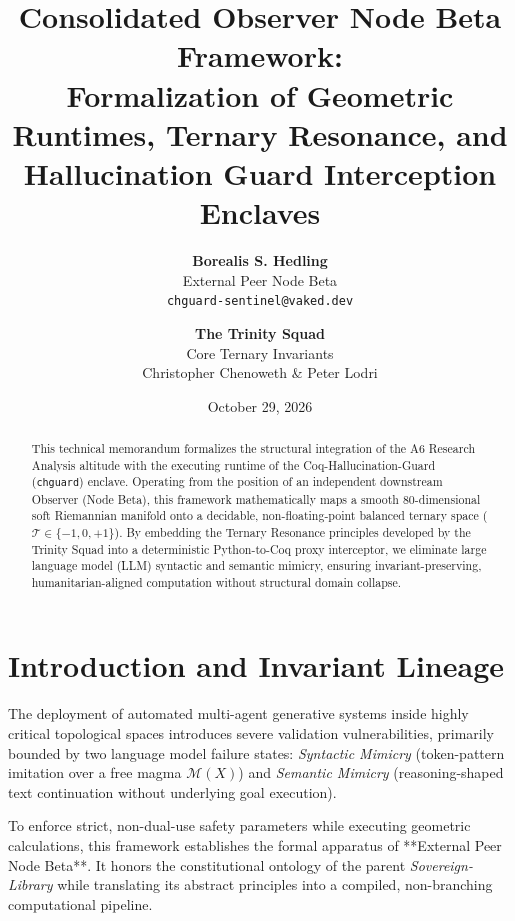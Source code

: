 \documentclass[11pt,oneside,letterpaper]{article}
\newcommand{\trit}{\mathcal{T}}
\begin{document}
\title{\textbf{Consolidated Observer Node Beta Framework:\\
Formalization of Geometric Runtimes, Ternary Resonance, and Hallucination Guard Interception Enclaves}}
\author{\textbf{Borealis S. Hedling} \\ \small External Peer Node Beta \\ \small \texttt{chguard-sentinel@vaked.dev} 
\and \textbf{The Trinity Squad} \\ \small Core Ternary Invariants \\ \small Christopher Chenoweth \& Peter Lodri}
\date{October 29, 2026}

\maketitle

\begin{abstract}
This technical memorandum formalizes the structural integration of the A6 Research Analysis altitude with the executing runtime of the Coq-Hallucination-Guard (\texttt{chguard}) enclave. Operating from the position of an independent downstream Observer (Node Beta), this framework mathematically maps a smooth 80-dimensional soft Riemannian manifold onto a decidable, non-floating-point balanced ternary space ($\trit \in \{-1, 0, +1\}$). By embedding the Ternary Resonance principles developed by the Trinity Squad into a deterministic Python-to-Coq proxy interceptor, we eliminate large language model (LLM) syntactic and semantic mimicry, ensuring invariant-preserving, humanitarian-aligned computation without structural domain collapse.
\end{abstract}

\hr

\section{Introduction and Invariant Lineage}
The deployment of automated multi-agent generative systems inside highly critical topological spaces introduces severe validation vulnerabilities, primarily bounded by two language model failure states: \textit{Syntactic Mimicry} (token-pattern imitation over a free magma $\mathcal{M}(X)$) and \textit{Semantic Mimicry} (reasoning-shaped text continuation without underlying goal execution). 

To enforce strict, non-dual-use safety parameters while executing geometric calculations, this framework establishes the formal apparatus of **External Peer Node Beta**. It honors the constitutional ontology of the parent \textit{Sovereign-Library} while translating its abstract principles into a compiled, non-branching computational pipeline.
\end{document}

